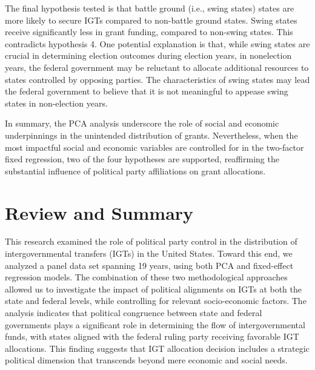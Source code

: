 The final hypothesis tested is that battle ground (i.e., swing states) states are more likely to secure IGTs compared to non-battle ground states. Swing states receive significantly less in grant funding, compared to non-swing states. This contradicts hypothesis 4. One potential explanation is that,
while swing states are crucial in determining election outcomes during election years, in nonelection years, the federal government may be reluctant to allocate additional resources to states controlled by opposing parties. The characteristics of swing states may lead the federal government
to believe that it is not meaningful to appease swing states in non-election years.

In summary, the PCA analysis underscore the role of social and economic underpinnings in the unintended distribution of grants. Nevertheless, when the most impactful social and economic variables are controlled for in the two-factor fixed regression, two of the four hypotheses are supported, reaffirming the substantial influence of political party affiliations on grant allocations.



\section{Review and Summary}

This research examined the role of political party control in the distribution of intergovernmental transfers (IGTs) in the United States. Toward this end, we analyzed a panel data set spanning 19 years, using both PCA and fixed-effect regression models. The combination of these two methodological approaches allowed us to investigate the impact of political alignments on IGTs at
both the state and federal levels, while controlling for relevant socio-economic factors. The analysis indicates that political congruence between state and federal governments plays a significant role in determining the flow of intergovernmental funds, with states aligned with the federal ruling party receiving favorable IGT allocations. This finding suggests that IGT allocation decision includes a strategic political dimension that transcends beyond mere economic and social needs.

